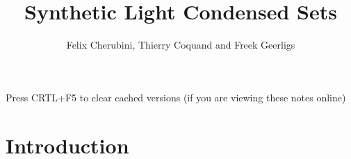 \documentclass{../util/zariski-small}
\title{Synthetic Light Condensed Sets}
\begin{document}
\author{Felix Cherubini, Thierry Coquand and Freek Geerligs}

\maketitle

\begin{center}
  \color{purple}
  \large{Press CRTL+F5 to clear cached versions}
  \large{(if you are viewing these notes online)}
\end{center}

\newcommand{\Boole}{\mathsf{Boole}}
\newcommand{\Stone}{\mathsf{Stone}}


\section*{Introduction}


\printindex

\printbibliography
\end{document}

